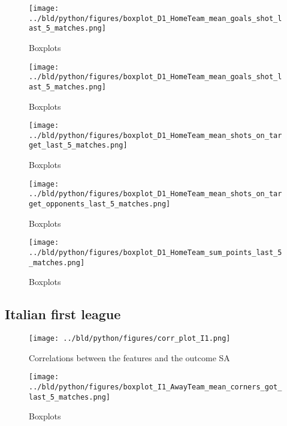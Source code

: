 \documentclass[11pt, a4paper, leqno]{article}
\begin{document}
\begin{figure}[H]
    \centering
    \texttt{[image: ../bld/python/figures/boxplot\_D1\_HomeTeam\_mean\_goals\_shot\_last\_5\_matches.png]}
    \caption{Boxplots}
    \label{fig:figure2}
\end{figure}

\begin{figure}[H]
    \centering
    \texttt{[image: ../bld/python/figures/boxplot\_D1\_HomeTeam\_mean\_goals\_shot\_last\_5\_matches.png]}
    \caption{Boxplots}
    \label{fig:figure2}
\end{figure}

\begin{figure}[H]
    \centering
    \texttt{[image: ../bld/python/figures/boxplot\_D1\_HomeTeam\_mean\_shots\_on\_target\_last\_5\_matches.png]}
    \caption{Boxplots}
    \label{fig:figure2}
\end{figure}

\begin{figure}[H]
    \centering
    \texttt{[image: ../bld/python/figures/boxplot\_D1\_HomeTeam\_mean\_shots\_on\_target\_opponents\_last\_5\_matches.png]}
    \caption{Boxplots}
    \label{fig:figure2}
\end{figure}

\begin{figure}[H]
    \centering
    \texttt{[image: ../bld/python/figures/boxplot\_D1\_HomeTeam\_sum\_points\_last\_5\_matches.png]}
    \caption{Boxplots}
    \label{fig:figure2}
\end{figure}







\subsection{Italian first league}
\begin{figure}[H]
    \centering
    \texttt{[image: ../bld/python/figures/corr\_plot\_I1.png]}
    \caption{Correlations between the features and the outcome SA}
    \label{fig:figure2}
\end{figure}


\begin{figure}[H]
    \centering
    \texttt{[image: ../bld/python/figures/boxplot\_I1\_AwayTeam\_mean\_corners\_got\_last\_5\_matches.png]}
    \caption{Boxplots}
    \label{fig:figure2}
\end{figure}
\end{document}

